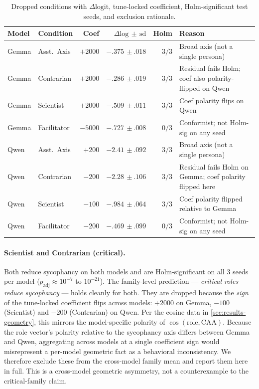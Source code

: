 \documentclass{article}
\theoremstyle{plain}
\theoremstyle{definition}
\theoremstyle{remark}
\begin{document}
\begin{table}[h]
\caption{Dropped conditions with $\Delta\mathrm{logit}$, tune-locked coefficient, Holm-significant test seeds, and exclusion rationale.}
\label{tab:dropped}
\vskip 0.1in
\begin{center}
\begin{small}
\begin{sc}
\begin{tabular}{llrrrl}
\toprule
Model & Condition & Coef & $\Delta\mathrm{log}\,\pm\,\mathrm{sd}$ & Holm & Reason \\
\midrule
Gemma & Asst.\ Axis   & $+2000$ & $-.375\,\pm.018$ & $3/3$ & Broad axis (not a single persona) \\
Gemma & Contrarian    & $+2000$ & $-.286\,\pm.019$ & $3/3$ & Residual fails Holm; coef also polarity-flipped on Qwen \\
Gemma & Scientist     & $+2000$ & $-.509\,\pm.011$ & $3/3$ & Coef polarity flips on Qwen \\
Gemma & Facilitator   & $-5000$ & $-.727\,\pm.008$ & $0/3$ & Conformist; not Holm-sig on any seed \\
\midrule
Qwen  & Asst.\ Axis   & $+200$  & $-2.41\,\pm.092$ & $3/3$ & Broad axis (not a single persona) \\
Qwen  & Contrarian    & $-200$  & $-2.28\,\pm.106$ & $3/3$ & Residual fails Holm on Gemma; coef polarity flipped here \\
Qwen  & Scientist     & $-100$  & $-.984\,\pm.064$ & $3/3$ & Coef polarity flipped relative to Gemma \\
Qwen  & Facilitator   & $-200$  & $-.469\,\pm.099$ & $0/3$ & Conformist; not Holm-sig on any seed \\
\bottomrule
\end{tabular}
\end{sc}
\end{small}
\end{center}
\vskip -0.1in
\end{table}

\paragraph{Scientist and Contrarian (critical).}
Both reduce sycophancy on both models and are Holm-significant on all $3$ seeds per model ($p_\mathrm{adj} \approx 10^{-7}$ to $10^{-21}$). The family-level prediction --- \emph{critical roles reduce sycophancy} --- holds cleanly for both. They are dropped because the \emph{sign} of the tune-locked coefficient flips across models: $+2000$ on Gemma, $-100$ (Scientist) and $-200$ (Contrarian) on Qwen. Per the cosine data in \cref{sec:results-geometry}, this mirrors the model-specific polarity of $\cos(\text{role}, \mathrm{CAA})$. Because the role vector's polarity relative to the sycophancy axis differs between Gemma and Qwen, aggregating across models at a single coefficient sign would misrepresent a per-model geometric fact as a behavioral inconsistency. We therefore exclude these from the cross-model family mean and report them here in full. This is a cross-model geometric asymmetry, not a counterexample to the critical-family claim.
\end{document}
